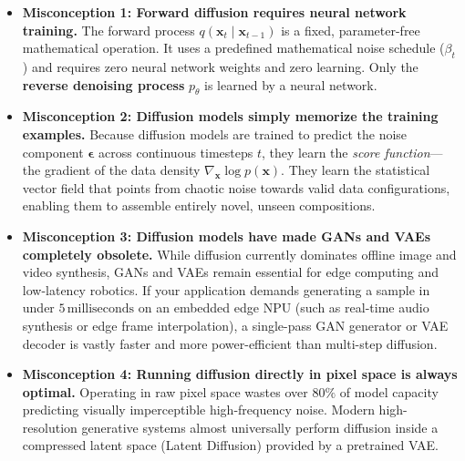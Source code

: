 \begin{warning}
\begin{itemize}
    \item \textbf{Misconception 1: Forward diffusion requires neural network training.}
    The forward process $q(\mathbf{x}_t \mid \mathbf{x}_{t-1})$ is a fixed, parameter-free mathematical operation. It uses a predefined mathematical noise schedule ($\beta_t$) and requires zero neural network weights and zero learning. Only the \textbf{reverse denoising process} $p_\theta$ is learned by a neural network.
    \item \textbf{Misconception 2: Diffusion models simply memorize the training examples.}
    Because diffusion models are trained to predict the noise component $\boldsymbol{\epsilon}$ across continuous timesteps $t$, they learn the \emph{score function}---the gradient of the data density $\nabla_{\mathbf{x}} \log p(\mathbf{x})$. They learn the statistical vector field that points from chaotic noise towards valid data configurations, enabling them to assemble entirely novel, unseen compositions.
    \item \textbf{Misconception 3: Diffusion models have made GANs and VAEs completely obsolete.}
    While diffusion currently dominates offline image and video synthesis, GANs and VAEs remain essential for edge computing and low-latency robotics. If your application demands generating a sample in under $5\,\text{milliseconds}$ on an embedded edge NPU (such as real-time audio synthesis or edge frame interpolation), a single-pass GAN generator or VAE decoder is vastly faster and more power-efficient than multi-step diffusion.
    \item \textbf{Misconception 4: Running diffusion directly in pixel space is always optimal.}
    Operating in raw pixel space wastes over $80\%$ of model capacity predicting visually imperceptible high-frequency noise. Modern high-resolution generative systems almost universally perform diffusion inside a compressed latent space (Latent Diffusion) provided by a pretrained VAE.
\end{itemize}
\end{warning}


